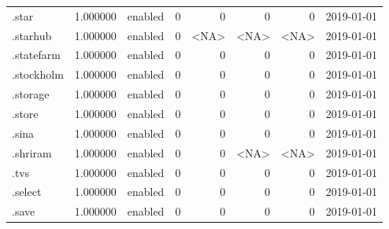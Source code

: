 \begin{tabular}{lrlrrrrl}
.star                     &          1.000000 &         enabled &                           0 &                           0 &                           0 &                   0 &           2019-01-01 \\
.starhub                  &          1.000000 &         enabled &                           0 &                        <NA> &                        <NA> &                <NA> &           2019-01-01 \\
.statefarm                &          1.000000 &         enabled &                           0 &                           0 &                           0 &                   0 &           2019-01-01 \\
.stockholm                &          1.000000 &         enabled &                           0 &                           0 &                           0 &                   0 &           2019-01-01 \\
.storage                  &          1.000000 &         enabled &                           0 &                           0 &                           0 &                   0 &           2019-01-01 \\
.store                    &          1.000000 &         enabled &                           0 &                           0 &                           0 &                   0 &           2019-01-01 \\
.sina                     &          1.000000 &         enabled &                           0 &                           0 &                           0 &                   0 &           2019-01-01 \\
.shriram                  &          1.000000 &         enabled &                           0 &                           0 &                        <NA> &                <NA> &           2019-01-01 \\
.tvs                      &          1.000000 &         enabled &                           0 &                           0 &                           0 &                   0 &           2019-01-01 \\
.select                   &          1.000000 &         enabled &                           0 &                           0 &                           0 &                   0 &           2019-01-01 \\
.save                     &          1.000000 &         enabled &                           0 &                           0 &                           0 &                   0 &           2019-01-01 \\

\end{tabular}
